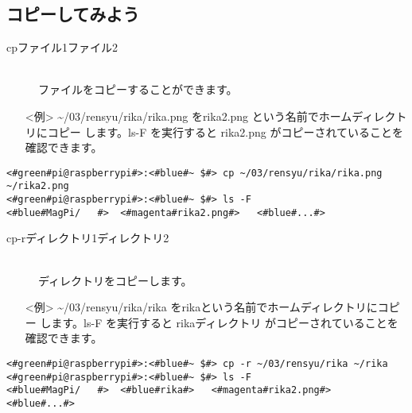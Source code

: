 \subsection{コピーしてみよう}
\begin{description}
\item[cp\textvisiblespace ファイル1\textvisiblespace ファイル2]\mbox{}\\
ファイルをコピーすることができます。
\end{description}
\begin{itemize}
\item[<例>]\textasciitilde /03/rensyu/rika/rika.png をrika2.png という名前でホームディレクトリにコピー
します。ls\textvisiblespace -F を実行すると rika2.png がコピーされていることを確認できます。
\end{itemize}
\begin{lstlisting}[caption=cpの例, label=cp]
<#green#pi@raspberrypi#>:<#blue#~ $#> cp ~/03/rensyu/rika/rika.png ~/rika2.png
<#green#pi@raspberrypi#>:<#blue#~ $#> ls -F
<#blue#MagPi/	#>	<#magenta#rika2.png#>	<#blue#...#>
\end{lstlisting}
\begin{description}
\item[cp\textvisiblespace -r\textvisiblespace ディレクトリ1\textvisiblespace ディレクトリ2]\mbox{}\\
ディレクトリをコピーします。
\end{description}
\begin{itemize}
\item[<例>]\textasciitilde /03/rensyu/rika/rika をrikaという名前でホームディレクトリにコピー
します。ls\textvisiblespace -F を実行すると rikaディレクトリ がコピーされていることを確認できます。
\end{itemize}
\begin{lstlisting}[caption=cp -rの例, label=cp-R]
<#green#pi@raspberrypi#>:<#blue#~ $#> cp -r ~/03/rensyu/rika ~/rika
<#green#pi@raspberrypi#>:<#blue#~ $#> ls -F
<#blue#MagPi/	#>	<#blue#rika#>	<#magenta#rika2.png#>	<#blue#...#>
\end{lstlisting}
\begin{tcolorbox}[title=\useOmetoi]
\begin{enumerate}
\end{enumerate}
\end{tcolorbox}
